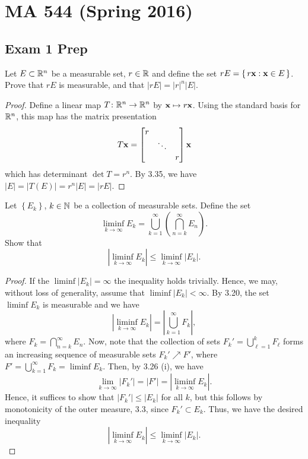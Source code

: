 \chapter{MA 544 (Spring 2016)}
\thispagestyle{empty}
\section{Exam 1 Prep}
\begin{problem}
Let $E\subset\mathbb{R}^n$ be a measurable set, $r\in\mathbb{R}$ and define the set
$rE=\left\{\,r\mathbf{x}:\mathbf{x}\in E\,\right\}$. Prove that $rE$ is
measurable, and that $|rE|=|r|^n|E|$.
\end{problem}
\begin{proof}
Define a linear map $T\colon\mathbb{R}^n\to\mathbb{R}^n$ by $\mathbf{x}\mapsto r\mathbf{x}$. Using
the standard basis for $\mathbb{R}^n$, this map has the matrix presentation
\begin{equation}
\label{eq:matrix-presentation}
T\mathbf{x}=
\begin{bmatrix}
r&\\
&\ddots\\
&&r
\end{bmatrix}\mathbf{x}
\end{equation}
which has determinant $\det T=r^n$. By 3.35, we have
$|E|=|T(E)|=r^n|E|=|rE|$.
\end{proof}

\begin{problem}
Let $\left\{ E_k \right\}$, $k\in\mathbb{N}$ be a collection of measurable
sets. Define the set
\[
\liminf_{k\to\infty} E_k
=\bigcup_{k=1}^\infty\left(\bigcap_{n=k}^\infty E_n\right).
\]
Show that
\[
\left|\liminf_{k\to\infty} E_k\right|\leq\liminf_{k\to\infty}\left|E_k\right|.
\]
\end{problem}
\begin{proof}
If the $\liminf\left|E_k\right|=\infty$ the inequality holds
trivially. Hence, we may, without loss of generality, assume that
$\liminf\left|E_k\right|<\infty$. By 3.20, the set $\liminf E_k$ is
measurable and we have
\begin{equation}
  \label{eq:limsup-rewrite}
\left|\liminf_{k\to\infty} E_k\right|
=\left|\bigcup_{k=1}^\infty F_k\right|,
\end{equation}
where $F_k=\bigcap_{n=k}^\infty E_n$. Now, note that the collection
of sets $F_k'=\bigcup_{\ell=1}^k F_\ell$ forms an increasing
sequence of measurable sets $F_k'\nearrow F'$, where
$F'=\bigcup_{k=1}^\infty F_k=\liminf E_k$. Then, by 3.26 (i), we have
\begin{equation}
  \label{eq:monotone-increasing-limit}
\lim_{k\to\infty}\left|F_k'\right|
=\left|F'\right|
=\left|\liminf_{k\to\infty} E_k\right|.
\end{equation}
Hence, it suffices to show that $\left|F_k'\right|\leq\left|E_k\right|$ for
all $k$, but this follows by monotonicity of the outer measure, 3.3, since
$F_k'\subset E_k$. Thus, we have the desired inequality
\begin{equation}
  \label{eq:meas-liminf-liminf-meas}
\left|\liminf_{k\to\infty} E_k\right|
\leq\liminf_{k\to\infty}\left|E_k\right|.
\end{equation}
\end{proof}

